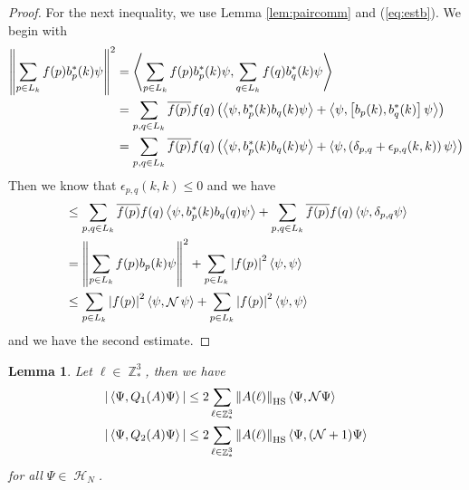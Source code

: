 \documentclass[sn-mathphys, Numbered ,a4paper]{sn-jnl}%
\DeclareMathOperator{\Z}{\mathbb{Z}}
\DeclareMathOperator{\HH}{\mathcal{H}}
\DeclareMathOperator{\NN}{\mathcal{N}}
\newcommand{\eva}[1]{\left\langle #1 \right\rangle}
\theoremstyle{plain}
\newtheorem{lemma}[theorem]{Lemma}
\theoremstyle{definition}
\theoremstyle{remark}
\theoremstyle{plain}
\theoremstyle{definition}
\theoremstyle{remark}
\begin{document}
\begin{proof}
    For the next inequality, we use Lemma \ref{lem:paircomm} and (\ref{eq:estb}). We begin with
    \begin{align}
        \norm{\sum\limits_{p\in L_k}f(p)b^*_p(k)\psi}^2 &= \eva{\sum\limits_{p\in L_k}f(p)b^*_p(k)\psi,\sum\limits_{q\in L_k}f(q)b^*_q(k)\psi}\nonumber\\
        &= \sum\limits_{p,q \in L_k} \overline{f(p)}f(q)\left( \eva{\psi,b^*_p(k)b_q(k)\psi} + \eva{\psi, \left[ b_p(k),b^*_q(k)\right]\psi}\right) \nonumber\\
        &=\sum\limits_{p,q \in L_k} \overline{f(p)}f(q)\left( \eva{\psi,b^*_p(k)b_q(k)\psi} + \eva{\psi, \left( \delta_{p,q} + \epsilon_{p,q} (k,k) \right)\psi}\right)
    \end{align}
    Then we know that $\epsilon_{p,q}(k,k)\leq 0$ and we have
    \begin{align}
        &\leq \sum\limits_{p,q \in L_k} \overline{f(p)}f(q) \eva{\psi,b^*_p(k)b_q(q)\psi} + \sum\limits_{p,q \in L_k} \overline{f(p)}f(q)\eva{\psi, \delta_{p,q}\psi}\nonumber\\
        &=  \norm{\sum\limits_{p\in L_k}f(p)b_p(k)\psi}^2 + \sum\limits_{p \in L_k} \abs{f(p)}^2 \eva{\psi, \psi}\nonumber\\
        &\leq \sum\limits_{p \in L_k} \abs{f(p)}^2 \eva{\psi, \NN \psi} + \sum\limits_{p \in L_k} \abs{f(p)}^2 \eva{\psi, \psi}
    \end{align}
    and we have the second estimate.
\end{proof}
\begin{lemma}\label{lem:estQ2}
    Let $\ell \in \Z^3_*$, then we have
    \begin{align}
        |\eva{\Psi,Q_1(A)\Psi}| &\leq 2\sum\limits_{\ell\in \Z^3_*}\norm{A(\ell)}_{\mathrm{HS}}\eva{\Psi,\mathcal{N} \Psi}\label{eq:Q1est}\\
        |\eva{\Psi,Q_2(A)\Psi}| &\leq 2\sum\limits_{\ell\in \Z^3_*}\norm{A(\ell)}_{\mathrm{HS}}\eva{\Psi,(\mathcal{N}+1) \Psi}\label{eq:Q2est}
    \end{align}
    for all $\Psi \in \HH_N$.
\end{lemma}
\end{document}
